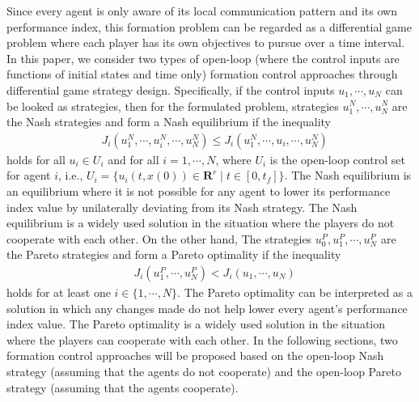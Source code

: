 \documentclass[12pt,draftcls,onecolumn]{IEEEtran}  %
\begin{document}
Since every agent is only aware of its local communication pattern and its own performance index, this formation problem can be regarded as a differential game problem where each player {has} its own objectives to pursue over a time interval. In this paper, we consider two types of open-loop {(where the control inputs are functions of initial states and time only)} formation control approaches through {differential} game strategy design. Specifically, {if the control inputs $u_1,\cdots,u_N$ can be looked as strategies}, then for the formulated problem, strategies {$u^{N}_{1},\cdots,u^{N}_N$} are the Nash strategies and form a Nash equilibrium if the inequality
\begin{align}
&{J_{i}(u_1^{N},\cdots,u^{N}_i,\cdots,u^{N}_N)\leq J_{i}(u_1^{N},\cdots,u_i,\cdots,u^{N}_N)}\label{Nashinequality}
\end{align}
holds for all $u_i\in U_i$ and for all $i=1,\cdots,N$, where $U_i$ is the open-loop control set for agent $i$, i.e., $U_i=\{u_i(t,x(0))\in \mathbf{R}^r \mid t\in[0,t_f]\}$. The Nash equilibrium is an equilibrium where it is not possible for any agent to lower its performance index value by unilaterally deviating from its Nash strategy. The Nash equilibrium is a widely used solution in the situation where the players do not {cooperate} with each other. On the other hand, The strategies $u^{P}_0,u^{P}_{1},\cdots,u^{P}_N$ are the Pareto strategies and {form a Pareto optimality if the inequality
\begin{align}
&J_{i}(u^P_1,\cdots,u^P_N)< J_{i}(u_1,\cdots,u_N) \label{inequality}
\end{align}
holds for at least one $i\in\{1,\cdots,N\}$.} The Pareto optimality can be interpreted as a solution in which any changes made do not help lower every agent's performance index value. The Pareto optimality is a widely used solution in the situation where the players can {cooperate} with each other. In the following sections, two formation control approaches will be proposed based on the open-loop Nash strategy (assuming that the agents do not {cooperate}) and the open-loop Pareto strategy (assuming that the agents {cooperate}).
\end{document}
